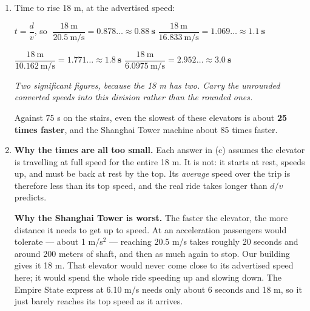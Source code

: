 \documentclass[12pt, twoside]{article}
\begin{document}
\begin{enumerate}[itemsep=0.25cm]
\begin{enumerate}[itemsep=0.3cm]
      \textbf{Yes, this ranking holds.} The four speeds are separated by several m/s, and
      the shakiest figures here --- ``2000'' and ``1200'' ft/min, whose trailing zeros are
      ambiguous and may carry only two significant figures --- are still nowhere near each
      other. Even reading them as $2.0 \times 10^{3}$ and $1.2 \times 10^{3}$ ft/min, the
      gaps between the four are far larger than the uncertainty.

      \emph{Compare with problem 4 on the 1.2 classwork, where the car at 26.8 m/s and the
      motorcycle at 27 m/s could not be told apart. Same question, opposite answer --- and
      the difference is the size of the gap relative to the precision, not the number of
      digits the calculator shows. Give credit for any answer that checks the gaps against
      the precision, however it is worded.}

    \item Time to rise 18 m, at the advertised speed:

      $t = \dfrac{d}{v}$, so
      $\;\dfrac{18~\text{m}}{20.5~\text{m/s}} = 0.878\ldots \approx \mathbf{0.88~\textbf{s}}$
      \quad
      $\dfrac{18~\text{m}}{16.833~\text{m/s}} = 1.069\ldots \approx \mathbf{1.1~\textbf{s}}$

      $\dfrac{18~\text{m}}{10.162~\text{m/s}} = 1.771\ldots \approx \mathbf{1.8~\textbf{s}}$
      \quad
      $\dfrac{18~\text{m}}{6.0975~\text{m/s}} = 2.952\ldots \approx \mathbf{3.0~\textbf{s}}$

      \emph{Two significant figures, because the 18 m has two. Carry the unrounded
      converted speeds into this division rather than the rounded ones.}

      Against 75 s on the stairs, even the slowest of these elevators is about
      \textbf{25 times faster}, and the Shanghai Tower machine about 85 times faster.

    \item \textbf{Why the times are all too small.} Each answer in (c) assumes the elevator
      is travelling at full speed for the entire 18 m. It is not: it starts at rest, speeds
      up, and must be back at rest by the top. Its \emph{average} speed over the trip is
      therefore less than its top speed, and the real ride takes longer than $d/v$ predicts.

      \textbf{Why the Shanghai Tower is worst.} The faster the elevator, the more distance
      it needs to get up to speed. At an acceleration passengers would tolerate --- about
      1 m/s$^2$ --- reaching 20.5 m/s takes roughly 20 seconds and around 200 meters of
      shaft, and then as much again to stop. Our building gives it 18 m. That elevator
      would never come close to its advertised speed here; it would spend the whole ride
      speeding up and slowing down. The Empire State express at 6.10 m/s needs only about
      6 seconds and 18 m, so it just barely reaches its top speed as it arrives.


\end{enumerate}
\end{enumerate}
\end{document}

